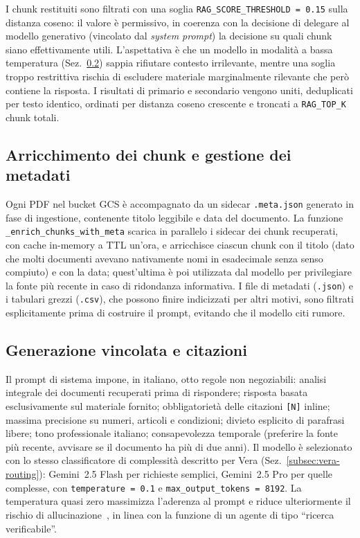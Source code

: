 I chunk restituiti sono filtrati con una soglia
\texttt{RAG\_SCORE\_THRESHOLD~=~0.15} sulla distanza coseno: il valore è
permissivo, in coerenza con la decisione di delegare al
modello generativo (vincolato dal \emph{system prompt}) la decisione su
quali chunk siano effettivamente utili. L'aspettativa è che un modello in
modalità a bassa temperatura (Sez.~\ref{subsec:coopolicy-generation})
sappia rifiutare contesto irrilevante, mentre una soglia troppo restrittiva
rischia di escludere materiale marginalmente rilevante che però contiene
la risposta. I risultati di primario e secondario vengono uniti,
deduplicati per testo identico, ordinati per distanza coseno crescente
e troncati a \texttt{RAG\_TOP\_K} chunk totali.

\subsection{Arricchimento dei chunk e gestione dei metadati}
\label{subsec:coopolicy-meta}

Ogni PDF nel bucket GCS è accompagnato da un sidecar \texttt{.meta.json}
generato in fase di ingestione, contenente titolo leggibile e data del
documento. La funzione \texttt{\_enrich\_chunks\_with\_meta} scarica in
parallelo i sidecar dei chunk recuperati, con cache in-memory a TTL
un'ora, e arricchisce ciascun chunk con il titolo (dato che molti documenti avevano
nativamente nomi in esadecimale senza senso compiuto) e con la
data; quest'ultima è poi utilizzata dal modello per privilegiare la
fonte più recente in caso di ridondanza informativa. I file di metadati
(\texttt{.json}) e i tabulari grezzi (\texttt{.csv}), che possono
finire indicizzati per altri motivi, sono filtrati esplicitamente prima
di costruire il prompt, evitando che il modello citi rumore.

\subsection{Generazione vincolata e citazioni}
\label{subsec:coopolicy-generation}

Il prompt di sistema impone, in italiano, otto regole non negoziabili:
analisi integrale dei documenti recuperati prima di rispondere; risposta
basata esclusivamente sul materiale fornito; obbligatoriet\`a delle
citazioni \texttt{[N]} inline; massima precisione su numeri, articoli e
condizioni; divieto esplicito di parafrasi libere; tono professionale
italiano; consapevolezza temporale (preferire la fonte più recente,
avvisare se il documento ha più di due anni). Il modello è selezionato con
lo stesso classificatore di complessità descritto per Vera
(Sez.~\ref{subsec:vera-routing}): Gemini~2.5 Flash per richieste semplici,
Gemini~2.5 Pro per quelle complesse,
con \texttt{temperature = 0.1} e \texttt{max\_output\_tokens = 8192}. La
temperatura quasi zero massimizza l'aderenza al prompt e riduce
ulteriormente il rischio di allucinazione~\cite{xu2024hallucination}, in
linea con la funzione di un agente di tipo ``ricerca verificabile''.

